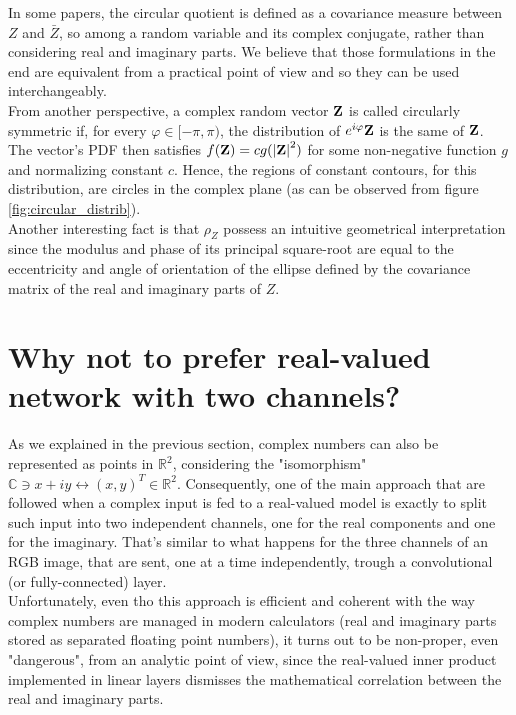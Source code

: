 \documentclass[../main.tex]{subfiles}
\begin{document}
In some papers, the circular quotient is defined as a covariance measure between $Z$ and $\bar{Z}$, so among a random variable and its complex conjugate, rather than considering real and imaginary parts. We believe that those formulations in the end are equivalent from a practical point of view and so they can be used interchangeably.\\
From another perspective, a complex random vector $\vb{Z}$ is called circularly symmetric if, for every $\varphi\in[-\pi,\pi)$, the distribution of $e^{i\varphi}\vb{Z}$ is the same of $\vb{Z}$. The vector's PDF then satisfies $f(\vb{Z})=cg(\abs{\vb{Z}}^2)$ for some non-negative function $g$ and normalizing constant $c$. Hence, the regions of constant contours, for this distribution, are circles in the complex plane (as can be observed from figure \ref{fig:circular_distrib}).\\
Another interesting fact is that $\rho_Z$ possess an intuitive geometrical interpretation since the modulus and phase of its principal square-root are equal to the eccentricity and angle of orientation of the ellipse defined by the covariance matrix of the real and imaginary parts of $Z$.



\section{Why not to prefer real-valued network with two channels?}
As we explained in the previous section, complex numbers can also be represented as points in $\mathds{R}^2$, considering the "isomorphism" $\mathds{C}\ni x+iy \leftrightarrow (x,y)^T\in\mathds{R}^2$. Consequently, one of the main approach that are followed when a complex input is fed to a real-valued model is exactly to split such input into two independent channels, one for the real components and one for the imaginary. That's similar to what happens for the three channels of an RGB image, that are sent, one at a time independently, trough a convolutional (or fully-connected) layer.\\
Unfortunately, even tho this approach is efficient and coherent with the way complex numbers are managed in modern calculators (real and imaginary parts stored as separated floating point numbers), it turns out to be non-proper, even "dangerous", from an analytic point of view, since the real-valued inner product implemented in linear layers dismisses the mathematical correlation between the real and imaginary parts.\\
 
\end{document}
